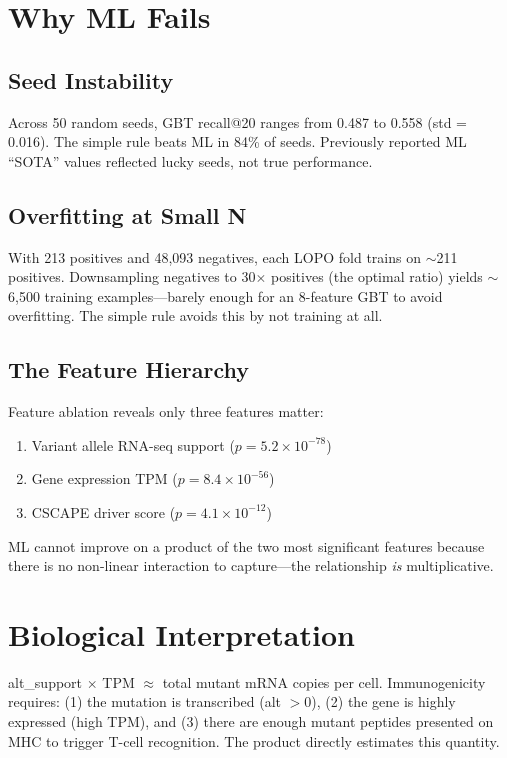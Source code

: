 \documentclass[11pt,twocolumn]{article}
\begin{document}
\section{Why ML Fails}

\subsection{Seed Instability}

Across 50 random seeds, GBT recall@20 ranges from 0.487 to 0.558
(std = 0.016). The simple rule beats ML in 84\% of seeds. Previously
reported ML ``SOTA'' values reflected lucky seeds, not true performance.

\subsection{Overfitting at Small N}

With 213 positives and 48,093 negatives, each LOPO fold trains on
$\sim$211 positives. Downsampling negatives to 30$\times$ positives
(the optimal ratio) yields $\sim$6,500 training examples---barely enough
for an 8-feature GBT to avoid overfitting. The simple rule avoids this
by not training at all.

\subsection{The Feature Hierarchy}

Feature ablation reveals only three features matter:
\begin{enumerate}[nosep]
\item Variant allele RNA-seq support ($p = 5.2 \times 10^{-78}$)
\item Gene expression TPM ($p = 8.4 \times 10^{-56}$)
\item CSCAPE driver score ($p = 4.1 \times 10^{-12}$)
\end{enumerate}

ML cannot improve on a product of the two most significant features
because there is no non-linear interaction to capture---the relationship
\textit{is} multiplicative.

\section{Biological Interpretation}

alt\_support $\times$ TPM $\approx$ total mutant mRNA copies per cell.
Immunogenicity requires: (1) the mutation is transcribed (alt $> 0$),
(2) the gene is highly expressed (high TPM), and (3) there are enough
mutant peptides presented on MHC to trigger T-cell recognition.
The product directly estimates this quantity.
\end{document}
